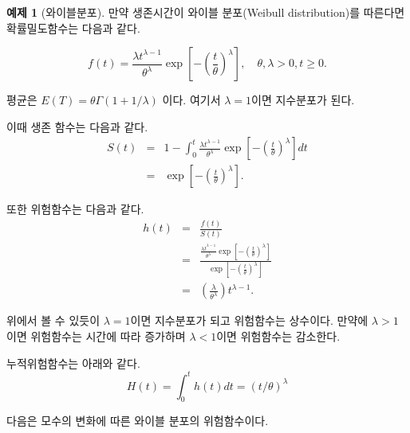 \documentclass[
]{book}
\theoremstyle{definition}
\theoremstyle{definition}
\newtheorem{example}{예제}[chapter]
\theoremstyle{definition}
\theoremstyle{definition}
\theoremstyle{remark}
\begin{document}
\begin{example}[와이블분포]
\protect\hypertarget{exm:unnamed-chunk-4}{}{\label{exm:unnamed-chunk-4} {} }
만약 생존시간이 와이블 분포(Weibull distribution)를 따른다면 확률밀도함수는 다음과 같다.

\[ f(t) = \frac{\lambda t^{\lambda-1}}{\theta^\lambda}
\exp \left[ - \left(\frac{t}{\theta} \right)^\lambda \right],
\quad \theta,\lambda>0,  t \geq 0.
\]

평균은 \(E(T)=\theta \Gamma(1+1/\lambda)\) 이다. 여기서 \(\lambda=1\)이면 지수분포가 된다.

이때 생존 함수는 다음과 같다.
\begin{eqnarray*}
  S(t) &=& 1-\int_0^t \frac{\lambda t^{\lambda-1}}{\theta^\lambda} \exp \left[
- \left( \frac{t}{\theta} \right)^\lambda  \right] dt \\
 &=& \exp \left[
- \left( \frac{t}{\theta} \right)^\lambda  \right].
\end{eqnarray*}

또한 위험함수는 다음과 같다.
\begin{eqnarray*}
h(t) &=& \frac{f(t)}{S(t)} \\
   &=& \frac{\frac{\lambda t^{\lambda-1}}{\theta^\lambda} \exp \left[
- \left( \frac{t}{\theta} \right)^\lambda  \right]}{\exp \left[
- \left( \frac{t}{\theta} \right)^\lambda  \right]}  \\
   &=& \left( \frac{\lambda }{\theta^\lambda} \right) t^{\lambda-1}.
\end{eqnarray*}

위에서 볼 수 있듯이 \(\lambda=1\)이면 지수분포가 되고 위험함수는 상수이다. 만약에 \(\lambda>1\)이면
위험함수는 시간에 따라 증가하며 \(\lambda<1\)이면 위험함수는 감소한다.

누적위험함수는 아래와 같다.
\[ H(t) = \int_0^t h(t) dt = (t/\theta)^\lambda \]
\end{example}

다음은 모수의 변화에 따른 와이블 분포의 위험함수이다.
\end{document}
